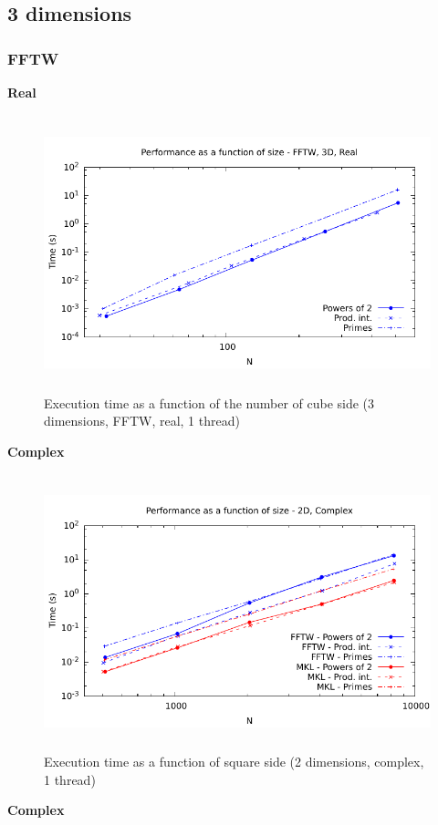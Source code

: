 \documentclass[12pt, a4paper]{article}
\begin{document}
\subsection{3 dimensions}
\subsubsection{FFTW}
{\bf Real}
\begin{figure}[H]
\captionsetup{width=0.6\textwidth}
\centering
\includegraphics[height=8cm]{graphs/performance/3d-fftw-r.pdf}
\caption{Execution time as a function of the number of cube side (3 dimensions, FFTW, real, 1 thread)}
\end{figure}
{\bf Complex}
\begin{figure}[H]
\captionsetup{width=0.6\textwidth}
\centering
\includegraphics[height=8cm]{graphs/performance/2d-c.pdf}
\caption{Execution time as a function of square side (2 dimensions, complex, 1 thread)}
\label{2DC}
\end{figure}
{\bf Complex}
\end{document}
